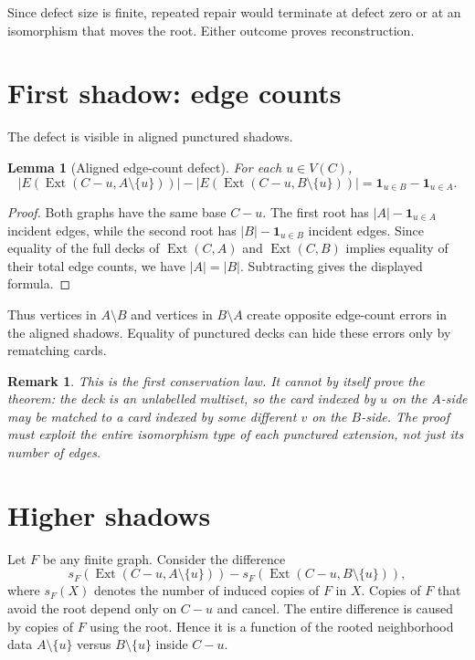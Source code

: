 \documentclass[11pt]{article}
\newtheorem{lemma}{Lemma}
\newtheorem{remark}{Remark}
\newcommand{\Ext}{\operatorname{Ext}}
\newcommand{\one}{\mathbf{1}}
\begin{document}
Since defect size is finite, repeated repair would terminate at defect zero or
at an isomorphism that moves the root.  Either outcome proves reconstruction.

\section{First shadow: edge counts}

The defect is visible in aligned punctured shadows.

\begin{lemma}[Aligned edge-count defect]
For each \(u \in V(C)\),
\[
  |E(\Ext(C-u,A\setminus\{u\}))|
  -
  |E(\Ext(C-u,B\setminus\{u\}))|
  =
  \one_{u \in B} - \one_{u \in A}.
\]
\end{lemma}

\begin{proof}
Both graphs have the same base \(C-u\).  The first root has
\(|A|-\one_{u\in A}\) incident edges, while the second root has
\(|B|-\one_{u\in B}\) incident edges.  Since equality of the full decks of
\(\Ext(C,A)\) and \(\Ext(C,B)\) implies equality of their total edge counts,
we have \(|A|=|B|\).  Subtracting gives the displayed formula.
\end{proof}

Thus vertices in \(A\setminus B\) and vertices in \(B\setminus A\) create
opposite edge-count errors in the aligned shadows.  Equality of punctured
decks can hide these errors only by rematching cards.

\begin{remark}
This is the first conservation law.  It cannot by itself prove the theorem:
the deck is an unlabelled multiset, so the card indexed by \(u\) on the
\(A\)-side may be matched to a card indexed by some different \(v\) on the
\(B\)-side.  The proof must exploit the entire isomorphism type of each
punctured extension, not just its number of edges.
\end{remark}

\section{Higher shadows}

Let \(F\) be any finite graph.  Consider the difference
\[
  s_F(\Ext(C-u,A\setminus\{u\}))
  -
  s_F(\Ext(C-u,B\setminus\{u\})),
\]
where \(s_F(X)\) denotes the number of induced copies of \(F\) in \(X\).
Copies of \(F\) that avoid the root depend only on \(C-u\) and cancel.  The
entire difference is caused by copies of \(F\) using the root.  Hence it is a
function of the rooted neighborhood data \(A\setminus\{u\}\) versus
\(B\setminus\{u\}\) inside \(C-u\).
\end{document}
